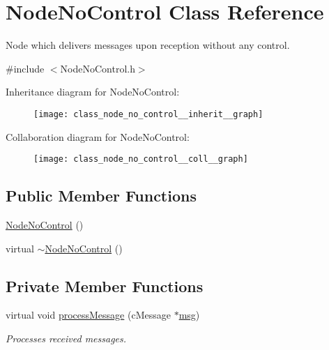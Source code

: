 \hypertarget{class_node_no_control}{}\section{Node\+No\+Control Class Reference}
\label{class_node_no_control}


Node which delivers messages upon reception without any control.  




{\ttfamily \#include $<$Node\+No\+Control.\+h$>$}



Inheritance diagram for Node\+No\+Control\+:\nopagebreak
\begin{figure}[H]
\begin{center}
\leavevmode
\texttt{[image: class\_node\_no\_control\_\_inherit\_\_graph]}
\end{center}
\end{figure}


Collaboration diagram for Node\+No\+Control\+:\nopagebreak
\begin{figure}[H]
\begin{center}
\leavevmode
\texttt{[image: class\_node\_no\_control\_\_coll\_\_graph]}
\end{center}
\end{figure}
\subsection*{Public Member Functions}
\begin{DoxyCompactItemize}
\item 
\hyperlink{class_node_no_control_ae48bd313edf922a104d690959f232822}{Node\+No\+Control} ()
\item 
virtual \hyperlink{class_node_no_control_a186d700d000404aa55658dd732e6ef4b}{$\sim$\+Node\+No\+Control} ()
\end{DoxyCompactItemize}
\subsection*{Private Member Functions}
\begin{DoxyCompactItemize}
\item 
virtual void \hyperlink{class_node_no_control_aa83bc408fe3dab03f124ea5489946836}{process\+Message} (c\+Message $\ast$\hyperlink{_controller_8h_afa0f3b802fbc219228f7bb97996fa558}{msg})
\begin{DoxyCompactList}\small\item\em Processes received messages. \end{DoxyCompactList}\end{DoxyCompactItemize}
